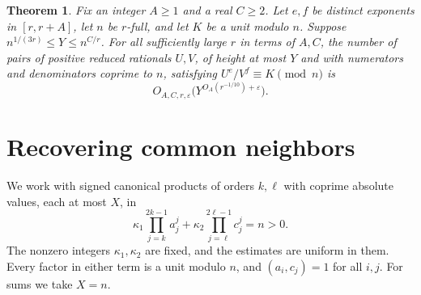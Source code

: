 \documentclass[11pt,reqno]{amsart}
\newtheorem{theorem}{Theorem}
\newcommand{\eps}{\varepsilon}
\begin{document}
\begin{theorem}\label{thm:monomial}
Fix an integer \(A\ge1\) and a real \(C\ge2\). Let \(e,f\) be distinct exponents in
\([r,r+A]\), let \(n\) be \(r\)-full, and let \(K\) be a unit modulo
\(n\). Suppose \(n^{1/(3r)}\le Y\le n^{C/r}\).
For all sufficiently large \(r\) in terms of \(A,C\), the number of
pairs of positive reduced rationals \(U,V\), of height at most
\(Y\) and with numerators and denominators coprime to \(n\),
satisfying \(U^e/V^f\equiv K\pmod n\) is
\[
                       O_{A,C,r,\eps}\bigl(Y^{O_A(r^{-1/10})+\eps}\bigr).
\]
\end{theorem}

\section{Recovering common neighbors}
We work with signed canonical products of orders \(k,\ell\) with
coprime absolute values, each at most \(X\), in
\begin{equation}\label{eq:coeff}
 \kappa_1\prod_{j=k}^{2k-1}a_j^j+
 \kappa_2\prod_{j=\ell}^{2\ell-1}c_j^j=n>0.
\end{equation}
The nonzero integers \(\kappa_1,\kappa_2\) are fixed, and the estimates
are uniform in them. Every factor in either term is a unit modulo
\(n\), and \((a_i,c_j)=1\) for all \(i,j\). For sums we take \(X=n\).
\end{document}
